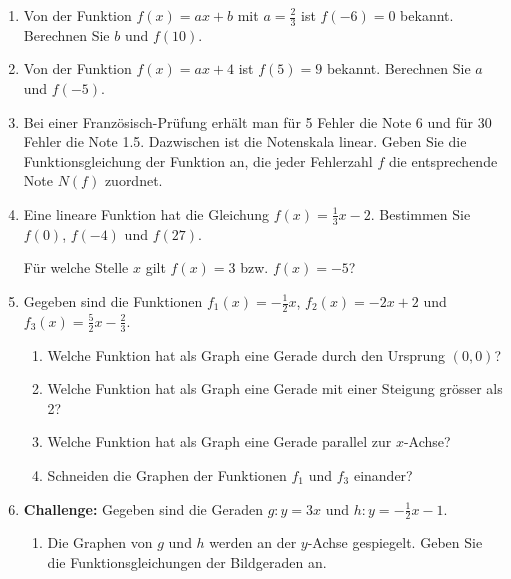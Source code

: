 \begin{ueb}
\begin{enumerate}
        \item Von der Funktion \(f(x)=ax+b\) mit \(a=\frac{2}{3}\)
              ist \(f(-6)=0\) bekannt.
              Berechnen Sie \(b\) und \(f(10)\).

        \item Von der Funktion \(f(x)=ax+4\) ist \(f(5)=9\) bekannt.
              Berechnen Sie \(a\) und \(f(-5)\).

        \item Bei einer Französisch-Prüfung erhält man für 5 Fehler die Note 6 und für 30 Fehler die Note 1.5. Dazwischen ist die Notenskala linear. Geben Sie die Funktionsgleichung der Funktion an, die jeder Fehlerzahl \(f\) die entsprechende Note \(N(f)\) zuordnet.

        \item Eine lineare Funktion hat die Gleichung
              \(f(x)=\frac{1}{3}x-2\).
              Bestimmen Sie \(f(0)\), \(f(-4)\) und \(f(27)\).

              Für welche Stelle \(x\) gilt \(f(x)=3\) bzw. \(f(x)=-5\)?
        \item Gegeben sind die Funktionen
              \(f_1(x)=-\frac{1}{2}x\),
              \(f_2(x)=-2x+2\) und
              \(f_3(x)=\frac{5}{2}x-\frac{2}{3}\).

              \begin{enumerate}
                  \item Welche Funktion hat als Graph eine Gerade durch
                        den Ursprung \((0, 0)\)?

                  \item Welche Funktion hat als Graph eine Gerade mit
                        einer Steigung grösser als 2?

                  \item Welche Funktion hat als Graph eine Gerade
                        parallel zur \(x\)-Achse?

                  \item Schneiden die Graphen der Funktionen \(f_1\)
                        und \(f_3\) einander?
              \end{enumerate}
        \item \textbf{Challenge:} Gegeben sind die Geraden \(g: y=3x\) und
              \(h: y=-\frac{1}{2}x-1\).

              \begin{enumerate}
                  \item Die Graphen von \(g\) und \(h\) werden an der
                        \(y\)-Achse gespiegelt.
                        Geben Sie die Funktionsgleichungen der Bildgeraden an.


\end{enumerate}
\end{enumerate}
\end{ueb}
